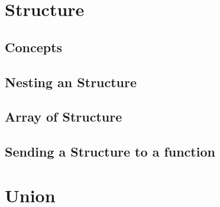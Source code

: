 \documentclass{article}
\begin{document}
\section{Structure}
\subsection{Concepts}
\subsection{Nesting an Structure}
\subsection{Array of Structure}
\subsection{Sending a Structure to a function}
\section{Union}
\end{document}
